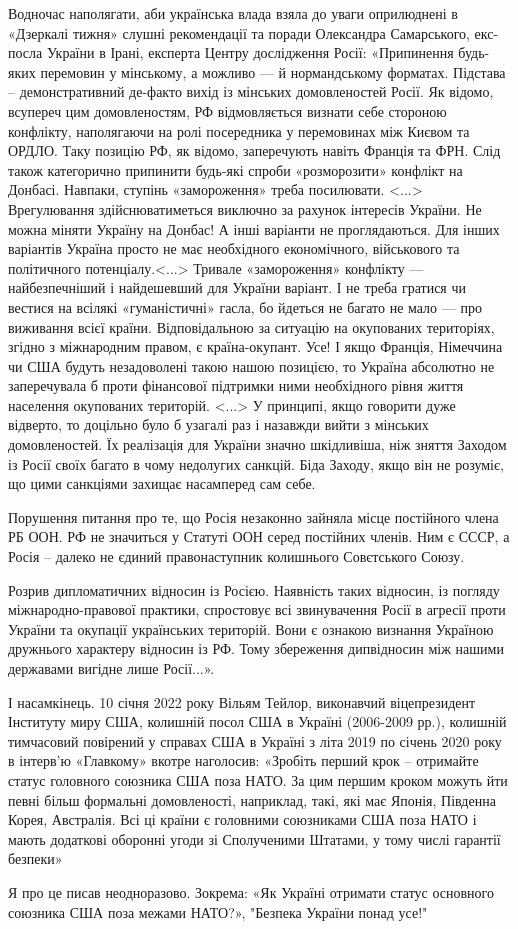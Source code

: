Водночас наполягати, аби українська влада взяла до уваги оприлюднені в
«Дзеркалі тижня» слушні рекомендації та поради Олександра Самарського,
екс-посла України в Ірані, експерта Центру дослідження Росії: «Припинення
будь-яких перемовин у мінському, а можливо — й нормандському форматах. Підстава
– демонстративний де-факто вихід із мінських домовленостей Росії. Як відомо,
всупереч цим домовленостям, РФ відмовляється визнати себе стороною конфлікту,
наполягаючи на ролі посередника у перемовинах між Києвом та ОРДЛО. Таку позицію
РФ, як відомо, заперечують навіть Франція та ФРН. Слід також категорично
припинити будь-які спроби «розморозити» конфлікт на Донбасі. Навпаки, ступінь
«замороження» треба посилювати. <...> Врегулювання здійснюватиметься виключно за
рахунок інтересів України. Не можна міняти Україну на Донбас! А інші варіанти
не проглядаються. Для інших варіантів Україна просто не має необхідного
економічного, військового та політичного потенціалу.<...> Тривале «замороження»
конфлікту — найбезпечніший і найдешевший для України варіант. І не треба
гратися чи вестися на всілякі «гуманістичні» гасла, бо йдеться не багато не
мало — про виживання всієї країни. Відповідальною за ситуацію на окупованих
територіях, згідно з міжнародним правом, є країна-окупант. Усе! І якщо Франція,
Німеччина чи США будуть незадоволені такою нашою позицією, то Україна абсолютно
не заперечувала б проти фінансової підтримки ними необхідного рівня життя
населення окупованих територій. <...> У принципі, якщо говорити дуже відверто, то
доцільно було б узагалі раз і назавжди вийти з мінських домовленостей. Їх
реалізація для України значно шкідливіша, ніж зняття Заходом із Росії своїх
багато в чому недолугих санкцій. Біда Заходу, якщо він не розуміє, що цими
санкціями захищає насамперед сам себе.

Порушення питання про те, що Росія незаконно зайняла місце постійного члена РБ
ООН. РФ не значиться у Статуті ООН серед постійних членів. Ним є СССР, а Росія
– далеко не єдиний правонаступник колишнього Совєтського Союзу.

Розрив дипломатичних відносин із Росією. Наявність таких відносин, із погляду
міжнародно-правової практики, спростовує всі звинувачення Росії в агресії проти
України та окупації українських територій. Вони є ознакою визнання Україною
дружнього характеру відносин із РФ. Тому збереження дипвідносин між нашими
державами вигідне лише Росії...».

І насамкінець. 10 січня 2022 року Вільям Тейлор, виконавчий віцепрезидент
Інституту миру США, колишній посол США в Україні (2006-2009 рр.), колишній
тимчасовий повірений у справах США в Україні з літа 2019 по січень 2020 року в
інтерв’ю «Главкому» вкотре наголосив: «Зробіть перший крок – отримайте статус
головного союзника США поза НАТО. За цим першим кроком можуть йти певні більш
формальні домовленості, наприклад, такі, які має Японія, Південна Корея,
Австралія. Всі ці країни є головними союзниками США поза НАТО і мають додаткові
оборонні угоди зі Сполученими Штатами, у тому числі гарантії безпеки»

Я про це писав неодноразово. Зокрема: «Як Україні отримати статус основного
союзника США поза межами НАТО?», "Безпека України понад усе!"
